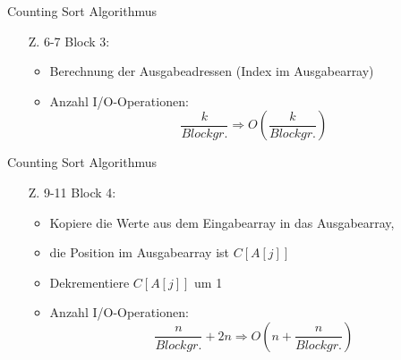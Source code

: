 \documentclass{beamer}
\begin{document}
\begin{frame}{Counting Sort Algorithmus}
  \begin{itemize}
    \item[Z. 6-7] Block 3:
    \begin{itemize}
      \item Berechnung der Ausgabeadressen (Index im Ausgabearray)
      \item Anzahl I/O-Operationen:
            \[
              \frac{k}{Blockgr.} \Rightarrow O(\frac{k}{Blockgr.})
            \]
    \end{itemize}
  \end{itemize}
  \vspace{1cm}
  \begin{figure}
    \flushright
  \end{figure}
\end{frame}

\begin{frame}{Counting Sort Algorithmus}
  \begin{itemize}
    \item[Z. 9-11] Block 4:
    \begin{itemize}
      \item Kopiere die Werte aus dem Eingabearray in das Ausgabearray,
      \item die Position im Ausgabearray ist $C[A[j]]$
      \item Dekrementiere $C[A[j]]$ um 1
      \item Anzahl I/O-Operationen:
            \[
              \frac{n}{Blockgr.} + 2n \Rightarrow O(n + \frac{n}{Blockgr.})
            \]
    \end{itemize}
  \end{itemize}

  \begin{figure}
    \flushright
  \end{figure}
\end{frame}
\end{document}
